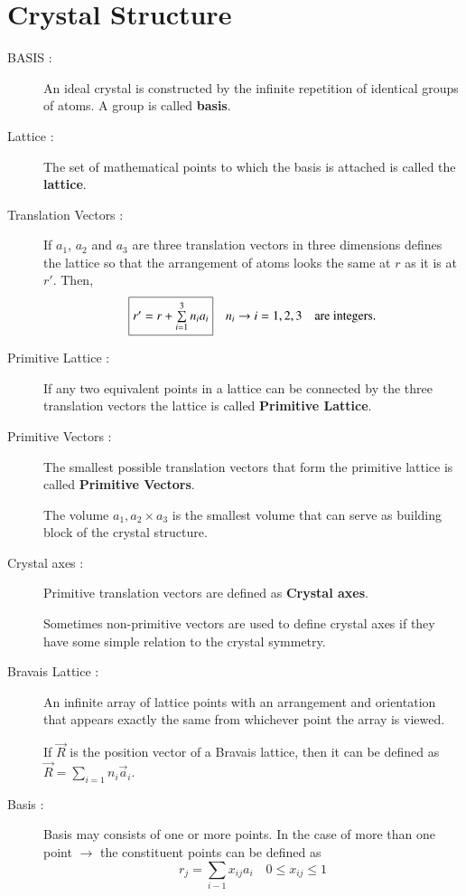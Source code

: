 \section*{Crystal Structure}

\begin{description}
\item[BASIS :] An ideal crystal is constructed by the infinite repetition of identical groups of atoms. A group is called {\bf basis}.

\item[Lattice :] The set of mathematical points to which the basis is attached is called the {\bf lattice}.

\item[Translation Vectors :] If $a_{1}$, $a_{2}$ and $a_{3}$ are three translation vectors in three dimensions defines the lattice so that the arrangement of atoms looks the same at $r$ as it is at $r'$. Then,
$$
\fbox{$r'=r+\sum\limits^{3}_{i=1}n_{i}a_{i}$}\quad n_{i}\to i=1,2,3\quad\text{are integers.}
$$

\item[Primitive Lattice :] If any two equivalent points in a lattice can be connected by the three translation vectors the lattice is called {\bf Primitive Lattice}.

\item[Primitive Vectors :] The smallest possible translation vectors that form the primitive lattice is called {\bf Primitive Vectors}.

The volume $a_{1},a_{2}\times a_{3}$ is the smallest volume that can serve as building block of the crystal structure.

\item[Crystal axes :] Primitive translation vectors are defined as {\bf Crystal axes}. 

Sometimes non-primitive vectors are used to define crystal axes if they have some simple relation to the crystal symmetry.

\item[Bravais Lattice :] An infinite array of lattice points with an arrangement and orientation that appears exactly the same from whichever point the array is viewed.

If $\overrightarrow{R}$ is the position vector of a Bravais lattice, then it can be defined as $\overrightarrow{R}=\sum\limits_{i=1}n_{i}\overrightarrow{a}_{i}$.

\item[Basis :] Basis may consists of one or more points. In the case of more than one point $\to$ the constituent points can be defined as
$$
r_{j}=\sum\limits_{i-1}x_{ij}a_{i}\quad 0\leq x_{ij}\leq 1
$$
\end{description}

